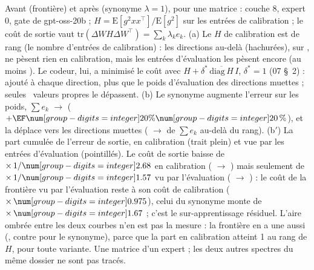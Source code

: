   {Avant (frontière) et après (synonyme $\lambda=1$), pour une matrice : couche 8, expert 0, gate de gpt-oss-20b ;
   $H=\mathrm{E}[g^2xx^\top]/\mathrm{E}[g^2]$ sur les entrées de calibration ; le coût de sortie vaut
   $\mathrm{tr}(\Delta W H\Delta W^\top)=\sum_k\lambda_k e_k$. (a) Le $H$ de calibration est de rang
   \CodonNum{\SynoNRang} (le nombre d'entrées de calibration) : les
   \CodonNum{\the\numexpr\SynoNDirections-\SynoNRang\relax} directions au-delà (hachurées), sur
   \CodonNum{\SynoNDirections}, ne pèsent rien en calibration, mais les entrées d'évaluation les pèsent encore (au
   moins \CodonNum{\SynoNLambdaEvalMin}). Le codeur, lui, a minimisé le coût avec
   $H+\delta^*\,\overline{\mathrm{diag}\,H}\,I$, $\delta^*=1$ (07 §~2) : \CodonNum{\SynoNAmorti} ajouté à chaque
   direction, plus que le poids d'évaluation des directions muettes ; seules \SynoNAmortiDessus\ valeurs propres le
   dépassent. (b) Le synonyme augmente l'erreur sur les poids, $\sum e_k$ \CodonNum{\SynoNEnergieF} $\to$
   \CodonNum{\SynoNEnergieS} ($+\Pourcent{\SynoNEnergieHausse}$), et la déplace vers les directions muettes
   (\Pourcent{\SynoNPartNulleF} $\to$ \Pourcent{\SynoNPartNulleS} de $\sum e_k$ au-delà du rang).
   (b$'$) La part cumulée de l'erreur de sortie, en calibration (trait plein) et vue par les entrées
   d'évaluation (pointillés). Le coût de sortie baisse de $\times\,1/\CodonNum{\SynoNCalibRapport}$ en calibration
   (\CodonNum{\SynoNCalibF} $\to$ \CodonNum{\SynoNCalibS}) mais seulement de $\times\,1/\CodonNum{\SynoNEvalRapport}$
   vu par l'évaluation (\CodonNum{\SynoNEvalF} $\to$ \CodonNum{\SynoNEvalS}) : le coût de la frontière vu par
   l'évaluation reste à son coût de calibration ($\times\,\CodonNum{\SynoNSurF}$), celui du synonyme monte de
   $\times\,\CodonNum{\SynoNSurS}$ ; c'est le sur-apprentissage résiduel. L'aire ombrée entre les deux courbes n'en
   est pas la mesure : la frontière en a une aussi (\CodonNum{\SynoNAireF}, contre \CodonNum{\SynoNAireS} pour le
   synonyme), parce que la part en calibration atteint 1 au rang de $H$, pour toute variante. Une matrice d'un
   expert ; les deux autres spectres du même dossier ne sont pas tracés.}

